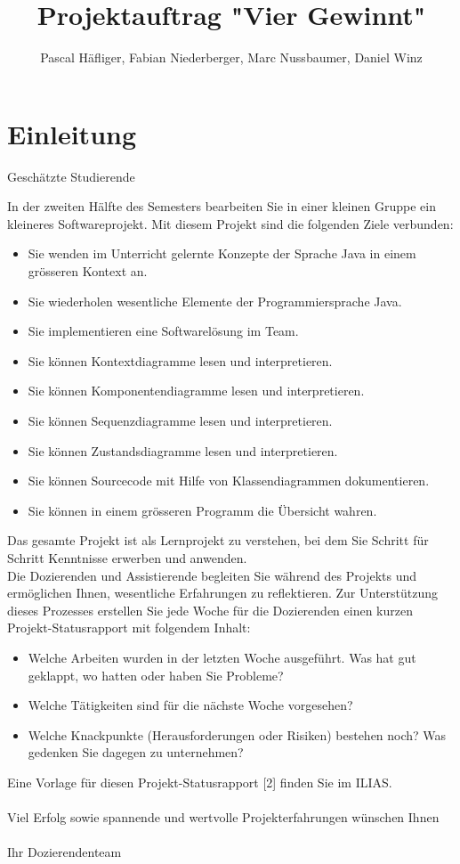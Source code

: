 \documentclass[a4paper, 10pt, fleqn]{article}
\author{Pascal Häfliger, Fabian Niederberger, Marc Nussbaumer, Daniel Winz}
\title{Projektauftrag "Vier Gewinnt"}
\begin{document}
\maketitle
\tableofcontents
\newpage

\section{Einleitung}
Geschätzte Studierende

In der zweiten Hälfte des Semesters bearbeiten Sie in einer kleinen Gruppe 
ein kleineres Softwareprojekt. Mit diesem Projekt sind die folgenden Ziele 
verbunden:
\begin{itemize}
    \item Sie wenden im Unterricht gelernte Konzepte der Sprache Java in 
        einem grösseren Kontext an.
    \item Sie wiederholen wesentliche Elemente der Programmiersprache Java.
    \item Sie implementieren eine Softwarelösung im Team.
    \item Sie können Kontextdiagramme lesen und interpretieren.
    \item Sie können Komponentendiagramme lesen und interpretieren.
    \item Sie können Sequenzdiagramme lesen und interpretieren.
    \item Sie können Zustandsdiagramme lesen und interpretieren.
    \item Sie können Sourcecode mit Hilfe von Klassendiagrammen dokumentieren.
    \item Sie können in einem grösseren Programm die Übersicht wahren.
\end{itemize}
Das gesamte Projekt ist als Lernprojekt zu verstehen, bei dem Sie Schritt 
für Schritt Kenntnisse erwerben und anwenden. \\
Die Dozierenden und Assistierende begleiten Sie während des Projekts und 
ermöglichen Ihnen, wesentliche Erfahrungen zu reflektieren. Zur Unterstützung 
dieses Prozesses erstellen Sie jede Woche für die Dozierenden einen kurzen 
Projekt-Statusrapport mit folgendem Inhalt:
\begin{itemize}
    \item Welche Arbeiten wurden in der letzten Woche ausgeführt. Was hat gut 
        geklappt, wo hatten oder haben Sie Probleme?
    \item Welche Tätigkeiten sind für die nächste Woche vorgesehen?
    \item Welche Knackpunkte (Herausforderungen oder Risiken) bestehen noch? 
        Was gedenken Sie dagegen zu unternehmen?
\end{itemize}
Eine Vorlage für diesen Projekt-Statusrapport [2] finden Sie im ILIAS.
\\\\
Viel Erfolg sowie spannende und wertvolle Projekterfahrungen wünschen Ihnen
\\\\
Ihr Dozierendenteam
\end{document}
